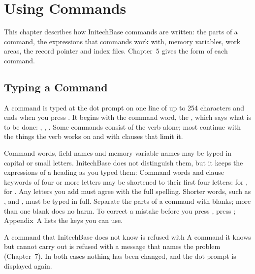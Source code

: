 \chapter{Using Commands}
This chapter describes how InitechBase commands are written: the parts of a
command, the expressions that commands work with, memory variables, work
areas, the record pointer and index files.  Chapter~5 gives the form of each
command.

\section{Typing a Command}
A command is typed at the dot prompt on one line of up to 254 characters and
ends when you press .  It begins with the command word, the
, which says what is to be done: , ,
.  Some commands consist of the verb alone; most continue with
the things the verb works on and with clauses that limit it.

Command words, field names and memory variable names may be typed in capital
or small letters.  InitechBase does not distinguish them, but it keeps the
expressions of a  heading as you typed them:
Command words and clause keywords of four or more letters may be shortened
to their first four letters:  for ,  for
.  Any letters you add must agree with the full spelling.
Shorter words, such as ,  and , must be typed in full.
Separate the parts of a command with blanks;
more than one blank does no harm.  To correct a mistake before you press
, press ; Appendix~A lists the keys you can use.

A command that InitechBase does not know is refused with
  A command it knows but cannot carry
out is refused with a message that names the problem (Chapter~7).  In both
cases nothing has been changed, and the dot prompt is displayed again.

